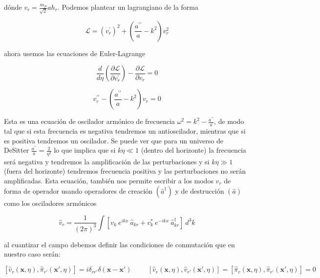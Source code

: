 \noindent
dónde $\displaystyle v_r = \frac{m_P}{\sqrt{2}} a h_r$. Podemos plantear un lagrangiano de la forma

\begin{equation}
    \mathcal{L} = \left( v^\prime_r \right)^2 + \left( \frac{a^{\prime \prime}}{a} - k^2 \right) v^2_r
\end{equation}

\noindent
ahora usemos las ecuaciones de Euler-Lagrange

\begin{equation}
    \frac{d}{d\eta} \left( \frac{\partial \mathcal{L}}{\partial v^\prime_r} \right) - \frac{\partial \mathcal{L}}{\partial v_r} = 0
\end{equation}

\begin{equation}\label{eqn:euler_lagrange_v}
    v^{\prime \prime}_r - \left( \frac{a^{\prime \prime}}{a} - k^2 \right) v_r = 0
\end{equation}

Esta es una ecuación de oscilador armónico de frecuencia $\displaystyle \omega^2 = k^2 - \frac{a^{\prime \prime}}{a}$, de modo tal que si esta frecuencia es negativa tendremos un antioscilador, mientras que si es positiva tendremos un oscilador. Se puede ver que para un universo de DeSitter $\displaystyle \frac{a^{\prime \prime}}{a} = \frac{2}{\eta^2}$ lo que implica que si $k \eta \ll 1$ (dentro del horizonte) la frecuencia será negativa y tendremos la amplificación de las perturbaciones y si $k \eta \gg 1$ (fuera del horizonte) tendremos frecuencia positiva y las perturbaciones no serán amplificadas. Esta ecuación, también nos permite escribir a los modos $v_r$ de forma de operador usando operadores de creación $\left( \hat{a}^\dagger \right)$ y de destrucción $\left( \hat{a} \right)$ como los osciladores armónicos

\begin{equation}\label{eqn:v_cuantizado}
    \hat{v}_r = \frac{1}{(2 \pi)^3} \int \left[ v_k \ e^{i k x} \ \hat{a}_{kr} + v_k^* \ e^{-ikx} \ \hat{a}_{kr}^\dagger \right] \ d^3 k
\end{equation}

\noindent
al cuantizar el campo debemos definir las condiciones de conmutación que en nuestro caso serán:

\begin{equation}
    \left[ \hat{v}_r \left( \textbf{x}, \eta \right), \hat{\pi}_{r'} \left( \textbf{x}', \eta \right) \right] = i \delta_{rr'} \delta \left( \textbf{x} - \textbf{x}' \right) \hspace{1cm} \left[ \hat{v}_r \left( \textbf{x}, \eta \right), \hat{v}_{r'} \left( \textbf{x}', \eta \right) \right] = \left[ \hat{\pi}_r \left( \textbf{x}, \eta \right), \hat{\pi}_{r'} \left( \textbf{x}', \eta \right) \right] = 0
\end{equation}

